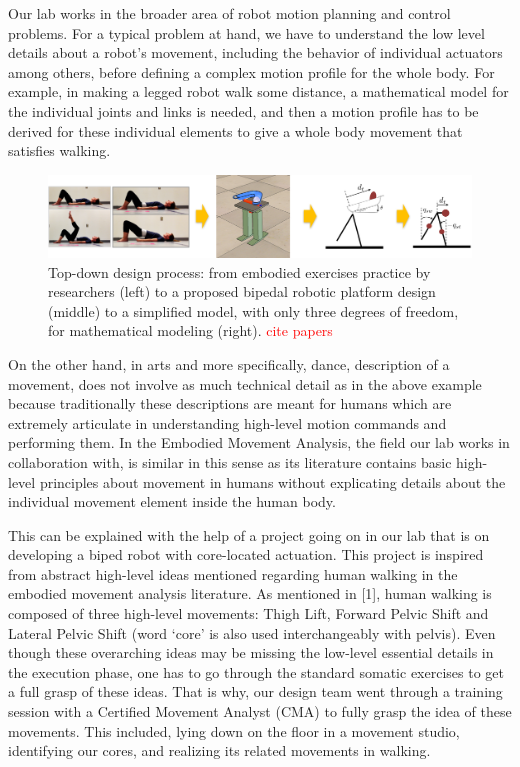 \documentclass[arts,article,submit,moreauthors,pdftex,10pt,a4paper]{mdpi}
\begin{document}
Our lab works in the broader area of robot motion planning and control problems. For a typical problem at hand, we have to understand the low level details about a robot’s movement, including the behavior of individual actuators among others, before defining a complex motion profile for the whole body. For example, in making a legged robot walk some distance, a mathematical model for the individual joints and links is needed, and then a motion profile has to be derived for these individual elements to give a whole body movement that satisfies walking.


\begin{figure}[h!]
\centering
\vspace{-.1in}
\includegraphics[width=.98\columnwidth]{walker}
\caption{Top-down design process: from embodied exercises practice by researchers (left) to a proposed bipedal robotic platform design (middle) to a simplified model, with only three degrees of freedom, for mathematical modeling (right).  \textcolor{red}{cite papers}}
\label{walker}
\end{figure}

On the other hand, in arts and more specifically, dance, description of a movement, does not involve as much technical detail as in the above example because traditionally these descriptions are meant for humans which are extremely articulate in understanding high-level motion commands and performing them. In the Embodied Movement Analysis, the field our lab works in collaboration with, is similar in this sense as its literature contains basic high-level principles about movement in humans without explicating details about the individual movement element inside the human body. 

This can be explained with the help of a project going on in our lab that is on developing a biped robot with core-located actuation. This project is inspired from abstract high-level ideas mentioned regarding human walking in the embodied movement analysis literature. As mentioned in [1], human walking is composed of three high-level movements: Thigh Lift, Forward Pelvic Shift and Lateral Pelvic Shift (word ‘core’ is also used interchangeably with pelvis). Even though these overarching ideas may be missing the low-level essential details in the execution phase, one has to go through the standard somatic exercises to get a full grasp of these ideas. That is why, our design team went through a training session with a Certified Movement Analyst (CMA) to fully grasp the idea of these movements. This included, lying down on the floor in a movement studio, identifying our cores, and realizing its related movements in walking.
\end{document}
